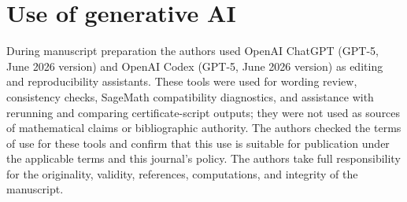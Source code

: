 \section*{Use of generative AI}
During manuscript preparation the authors used OpenAI ChatGPT
(GPT-5, June 2026 version) and OpenAI Codex (GPT-5, June 2026 version)
as editing and reproducibility assistants.  These tools were used for
wording review, consistency checks, SageMath compatibility diagnostics,
and assistance with rerunning and comparing certificate-script outputs;
they were not used as sources of mathematical claims or bibliographic
authority.  The authors checked the terms of use for these tools and
confirm that this use is suitable for publication under the applicable
terms and this journal's policy.  The authors take full responsibility
for the originality, validity, references, computations, and integrity
of the manuscript.
